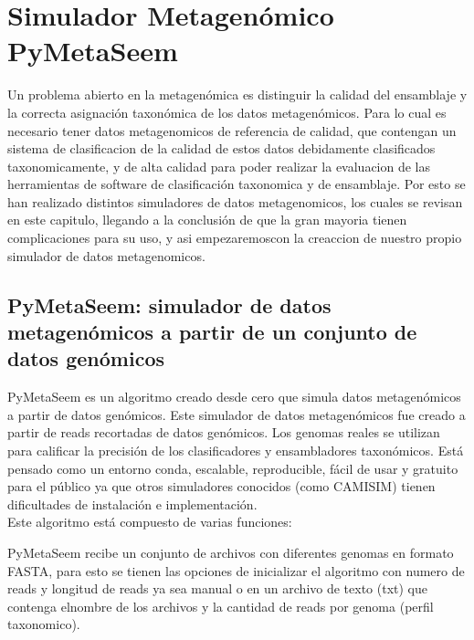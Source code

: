 \chapter{Simulador Metagenómico PyMetaSeem}
Un problema abierto en la metagenómica es distinguir la calidad del ensamblaje y la correcta asignación taxonómica de los datos metagenómicos. Para lo cual es necesario tener datos metagenomicos de referencia de calidad, que contengan un sistema de clasificacion de la calidad de estos datos debidamente clasificados taxonomicamente, y de alta calidad para poder realizar la evaluacion de las herramientas de software de clasificación taxonomica y  de ensamblaje. Por esto se han realizado distintos simuladores de datos metagenomicos, los cuales se revisan en este capitulo, llegando a la conclusión de que la gran mayoria tienen complicaciones para su uso, y asi empezaremoscon la creaccion de nuestro propio simulador de datos metagenomicos.   \\



\section{PyMetaSeem: simulador de datos metagenómicos a partir de un conjunto de datos genómicos}

PyMetaSeem es un algoritmo creado desde cero que simula datos metagenómicos a partir de datos genómicos. Este simulador de datos metagenómicos fue creado a partir de reads recortadas de datos genómicos. Los genomas reales se utilizan para calificar la precisión de los clasificadores y ensambladores taxonómicos. Está pensado como un entorno conda, escalable, reproducible, fácil de usar y gratuito para el público ya que otros simuladores conocidos (como CAMISIM) tienen dificultades de instalación e implementación.  \\



Este algoritmo está compuesto de varias funciones:

PyMetaSeem recibe un conjunto de archivos con diferentes genomas en formato FASTA, para esto se tienen las opciones de inicializar el algoritmo con numero de reads y longitud de reads ya sea manual o en un archivo de texto (txt) que contenga elnombre de los archivos y la cantidad de reads por genoma (perfil taxonomico).  \\

